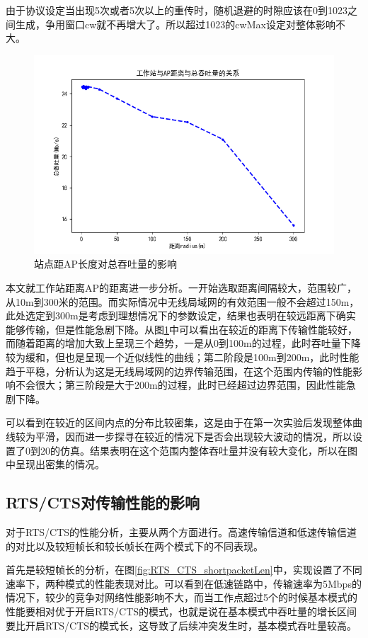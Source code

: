 \documentclass{article}
\begin{document}
由于协议设定当出现5次或者5次以上的重传时，随机退避的时隙应该在0到1023之间生成，争用窗口cw就不再增大了。所以超过1023的cwMax设定对整体影响不大。

\begin{figure}[ht]
	\centering
	\includegraphics[scale=0.6]{picture/radius.png}
	\caption{站点距AP长度对总吞吐量的影响}
	\label{fig:radius}
\end{figure}

本文就工作站距离AP的距离进一步分析。一开始选取距离间隔较大，范围较广，从10m到300米的范围。而实际情况中无线局域网的有效范围一般不会超过150m，此处选定到300m是考虑到理想情况下的参数设定，结果也表明在较远距离下确实能够传输，但是性能急剧下降。从图\ref{fig:radius}中可以看出在较近的距离下传输性能较好，而随着距离的增加大致上呈现三个趋势，一是从0到100m的过程，此时吞吐量下降较为缓和，但也是呈现一个近似线性的曲线；第二阶段是100m到200m，此时性能趋于平稳，分析认为这是无线局域网的边界传输范围，在这个范围内传输的性能影响不会很大；第三阶段是大于200m的过程，此时已经超过边界范围，因此性能急剧下降。

可以看到在较近的区间内点的分布比较密集，这是由于在第一次实验后发现整体曲线较为平滑，因而进一步探寻在较近的情况下是否会出现较大波动的情况，所以设置了0到20的仿真。结果表明在这个范围内整体吞吐量并没有较大变化，所以在图中呈现出密集的情况。
\subsection{RTS/CTS对传输性能的影响}

对于RTS/CTS的性能分析，主要从两个方面进行。高速传输信道和低速传输信道的对比以及较短帧长和较长帧长在两个模式下的不同表现。

首先是较短帧长的分析，在图\ref{fig:RTS_CTS_shortpacketLen}中，实现设置了不同速率下，两种模式的性能表现对比。可以看到在低速链路中，传输速率为5Mbps的情况下，较少的竞争对网络性能影响不大，而当工作点超过5个的时候基本模式的性能要相对优于开启RTS/CTS的模式，也就是说在基本模式中吞吐量的增长区间要比开启RTS/CTS的模式长，这导致了后续冲突发生时，基本模式吞吐量较高。
\end{document}
